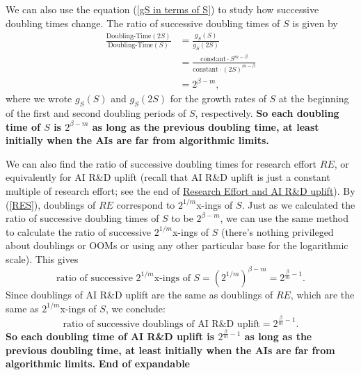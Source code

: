 \documentclass{article}
\theoremstyle{definition}
\begin{document}
We can also use the equation (\ref{gS in terms of S}) to study how successive doubling times change. The ratio of successive doubling times of $S$ is given by
\[ \begin{aligned}
\frac{\text{Doubling-Time}(2S)}{\text{Doubling-Time}(S)} &= \frac{g_S(S)}{g_S(2S)} \\
&= \frac{\text{constant} \cdot S^{m-\beta}}{\text{constant} \cdot (2S)^{m-\beta}} \\
&= 2^{\beta - m},
\end{aligned}\]
where we wrote $g_S(S)$ and $g_S(2S)$ for the growth rates of $S$ at the beginning of the first and second doubling periods of $S$, respectively. \textbf{So each doubling time of $S$ is $2^{\beta-m}$ as long as the previous doubling time, at least initially when the AIs are far from algorithmic limits.}

We can also find the ratio of successive doubling times for research effort $RE$, or equivalently for AI R\&D uplift (recall that AI R\&D uplift is just a constant multiple of research effort; see the end of \hyperref[Research effort]{Research Effort and AI R\&D uplift}). By (\ref{RES}), doublings of $RE$ correspond to $2^{1/m}$x-ings of $S$. Just as we calculated the ratio of successive doubling times of $S$ to be $2^{\beta-m}$, we can use the same method to calculate the ratio of successive $2^{1/m}$x-ings of $S$ (there's nothing privileged about doublings or OOMs or using any other particular base for the logarithmic scale). This gives
\[ \text{ratio of successive $2^{1/m}$x-ings of $S$} = \left(2^{1/m}\right)^{\beta-m} = 2^{\frac{\beta}{m}-1}.\]
Since doublings of AI R\&D uplift are the same as doublings of $RE$, which are the same as $2^{1/m}$x-ings of $S$, we conclude:
\[ \text{ratio of successive doublings of AI R\&D uplift} = 2^{\frac{\beta}{m}-1}.\]
\textbf{So each doubling time of AI R\&D uplift is $2^{\frac{\beta}{m}-1}$ as long as the previous doubling time, at least initially when the AIs are far from algorithmic limits.} \textbf{End of expandable}
\end{document}
